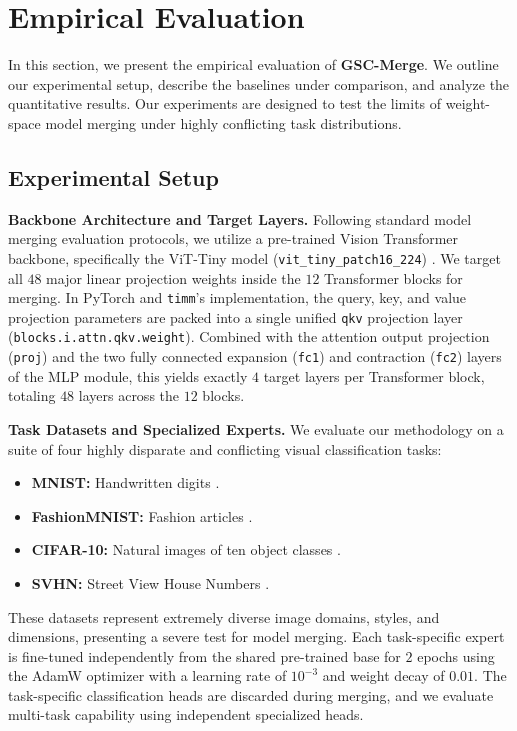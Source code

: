 \section{Empirical Evaluation}
\label{sec:experiments}

In this section, we present the empirical evaluation of \textbf{GSC-Merge}. We outline our experimental setup, describe the baselines under comparison, and analyze the quantitative results. Our experiments are designed to test the limits of weight-space model merging under highly conflicting task distributions.

\subsection{Experimental Setup}
\textbf{Backbone Architecture and Target Layers.} Following standard model merging evaluation protocols, we utilize a pre-trained Vision Transformer backbone, specifically the ViT-Tiny model (\texttt{vit\_tiny\_patch16\_224}) \cite{dosovitskiy2020image}. We target all $48$ major linear projection weights inside the $12$ Transformer blocks for merging. In PyTorch and \texttt{timm}'s implementation, the query, key, and value projection parameters are packed into a single unified \texttt{qkv} projection layer (\texttt{blocks.i.attn.qkv.weight}). Combined with the attention output projection (\texttt{proj}) and the two fully connected expansion (\texttt{fc1}) and contraction (\texttt{fc2}) layers of the MLP module, this yields exactly $4$ target layers per Transformer block, totaling $48$ layers across the $12$ blocks.

\textbf{Task Datasets and Specialized Experts.} We evaluate our methodology on a suite of four highly disparate and conflicting visual classification tasks:
\begin{itemize}
    \item \textbf{MNIST:} Handwritten digits \cite{lecun1998gradient}.
    \item \textbf{FashionMNIST:} Fashion articles \cite{xiao2017fashion}.
    \item \textbf{CIFAR-10:} Natural images of ten object classes \cite{krizhevsky2009learning}.
    \item \textbf{SVHN:} Street View House Numbers \cite{netzer2011reading}.
\end{itemize}
These datasets represent extremely diverse image domains, styles, and dimensions, presenting a severe test for model merging. Each task-specific expert is fine-tuned independently from the shared pre-trained base for $2$ epochs using the AdamW optimizer \cite{loshchilov2017decoupled} with a learning rate of $10^{-3}$ and weight decay of $0.01$. The task-specific classification heads are discarded during merging, and we evaluate multi-task capability using independent specialized heads.

